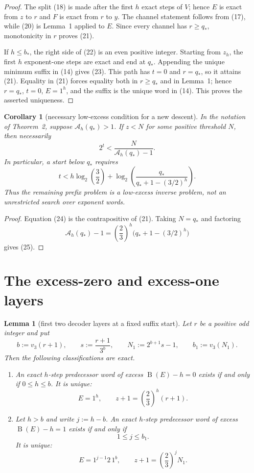 \documentclass[11pt]{article}
\newtheorem{corollary}[theorem]{Corollary}
\newtheorem{lemma}[theorem]{Lemma}
\newcommand{\mass}{\operatorname{B}}
\begin{document}
\begin{proof}
The split (18) is made after the first $h$ exact steps of $V$; hence
$E$ is exact from $z$ to $r$ and $F$ is exact from $r$ to $y$.  The
channel statement follows from (17), while (20) is Lemma~1 applied to
$E$.  Since every channel has $r\geq q_*$, monotonicity in $r$ proves
(21).

If $h\leq b_*$, the right side of (22) is an even positive integer.
Starting from $z_h$, the first $h$ exponent-one steps are exact and end
at $q_*$.  Appending the unique minimum suffix in (14) gives (23).
This path has $t=0$ and $r=q_*$, so it attains (21).  Equality in (21)
forces equality both in $r\geq q_*$ and in Lemma~1; hence $r=q_*$,
$t=0$, $E=1^h$, and the suffix is the unique word in (14).  This proves
the asserted uniqueness.
\end{proof}

\begin{corollary}[necessary low-excess condition for a new descent]
In the notation of Theorem~2, suppose $\mathcal A_h(q_*)>1$.  If
$z<N$ for some positive threshold $N$, then necessarily
\[
 \boxed{
 2^t<\frac{N}{\mathcal A_h(q_*)-1}.}
 \tag{24}
\]
In particular, a start below $q_*$ requires
\[
 t< h\log_2\!\left(\frac32\right)
 +\log_2\!\left(
 \frac{q_*}{q_*+1-(3/2)^h}
 \right).
 \tag{25}
\]
Thus the remaining prefix problem is a low-excess inverse problem, not
an unrestricted search over exponent words.
\end{corollary}

\begin{proof}
Equation (24) is the contrapositive of (21).  Taking $N=q_*$ and
factoring
\[
 \mathcal A_h(q_*)-1
 =\left(\frac23\right)^h
 \bigl(q_*+1-(3/2)^h\bigr)
\]
gives (25).
\end{proof}

\section{The excess-zero and excess-one layers}

\begin{lemma}[first two decoder layers at a fixed suffix start]
Let $r$ be a positive odd integer and put
\[
 b:=v_3(r+1),
 \qquad s:=\frac{r+1}{3^b},
 \qquad N_1:=2^{b+1}s-1,
 \qquad b_1:=v_3(N_1).
 \tag{26}
\]
Then the following classifications are exact.

\begin{enumerate}
 \item An exact $h$-step predecessor word of excess
 $\mass(E)-h=0$ exists if and only if $0\leq h\leq b$.  It is unique:
 \[
  E=1^h,
  \qquad z+1=\left(\frac23\right)^h(r+1).
  \tag{27}
 \]

 \item Let $h>b$ and write $j:=h-b$.  An exact $h$-step predecessor
 word of excess $\mass(E)-h=1$ exists if and only if
 \[
  1\leq j\leq b_1.
  \tag{28}
 \]
 It is unique:
 \[
  \boxed{
  E=1^{j-1}2\,1^b,
  \qquad z+1=\left(\frac23\right)^jN_1.}
  \tag{29}
 \]
\end{enumerate}
\end{lemma}
\end{document}

